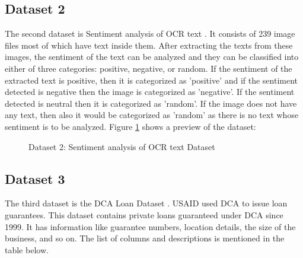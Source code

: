 \newpage
\subsection{Dataset 2} \label{subsection:data2}
The second dataset is Sentiment analysis of \acs{OCR} text \cite{sentiocrkaggle}. It consists of 239 image files most of which have text inside them. After extracting the texts from these images, the sentiment of the text can be analyzed and they can be classified into either of three categories: positive, negative, or random. If the sentiment of the extracted text is positive, then it is categorized as 'positive' and if the sentiment detected is negative then the image is categorized as 'negative'. If the sentiment detected is neutral then it is categorized as 'random'. If the image does not have any text, then also it would be categorized as 'random' as there is no text whose sentiment is to be analyzed. Figure \ref{sentiocrdataset} shows a preview of the dataset:
\begin {figure}[ht]
\centering
{}
\caption{Dataset 2: Sentiment analysis of \acs{OCR} text Dataset}
\label{sentiocrdataset}
\end {figure}

\subsection{Dataset 3} \label{subsection:data3}
The third dataset is the \acs{DCA} Loan Dataset \cite{dcakaggle}. \ac{USAID} used \ac{DCA} \cite{dcalink} to issue loan guarantees.
This dataset contains private loans guaranteed under \acs{DCA} since 1999. It has information like guarantee numbers, location details, the size of the business, and so on. The list of columns and descriptions is mentioned in the table below.

